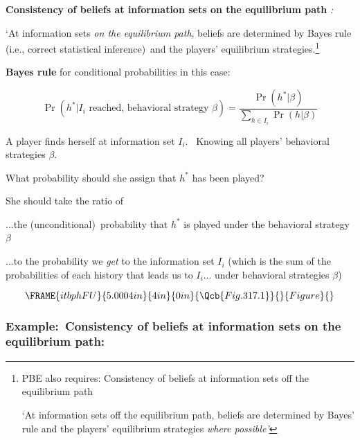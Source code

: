 \documentclass{article}
\begin{document}
\bigskip

\textbf{Consistency of beliefs at information sets on the equilibrium path}%
\textit{:}

`At information sets \textit{on the equilibrium path}, beliefs are
determined by Bayes rule (i.e., correct statistical inference)\ and the
players' equilibrium strategies.\footnote{%
PBE also requires: Consistency of beliefs at information sets off the
equilibrium path
\par
`At information sets off the equilibrium path, beliefs are determined by
Bayes' rule and the players' equilibrium strategies \textit{where possible'}
\par
{}}

\bigskip

\textbf{Bayes rule} for conditional probabilities in this case:

\[
\Pr (h^{\ast }|I_{i}\text{ reached, behavioral strategy }\beta )=\frac{\Pr
(h^{\ast }|\beta )}{\sum\limits_{h\in I_{i}}\Pr (h|\beta )} 
\]

A player finds herself at information set $I_{i}$. \ Knowing all players'
behavioral strategies $\beta $. \ 

What probability should she assign that $h^{\ast }$ has been played? \ 

She should take the ratio of

...the (unconditional)\ probability that $h^{\ast }$ is played under the
behavioral strategy $\beta $ \ 

...to the probability we \textit{get }to the information set $I_{i}$ (which
is the sum of the probabilities of each history that leads us to $I_{i}$...
under behavioral strategies $\beta $)

\pagebreak

\begin{equation}
\FRAME{itbphFU}{5.0004in}{4in}{0in}{\Qcb{Fig. 317.1}}{}{Figure}{\special%
{language "Scientific Word";type "GRAPHIC";maintain-aspect-ratio
TRUE;display "USEDEF";valid_file "T";width 5.0004in;height 4in;depth
0in;original-width 5.6886in;original-height 3.5201in;cropleft "0";croptop
"1";cropright "1";cropbottom "0";tempfilename
'JSH1WT0A.wmf';tempfile-properties "XPR";}}
\end{equation}

\subsubsection{Example:\ Consistency of beliefs at information sets on the
equilibrium path:}
\end{document}
